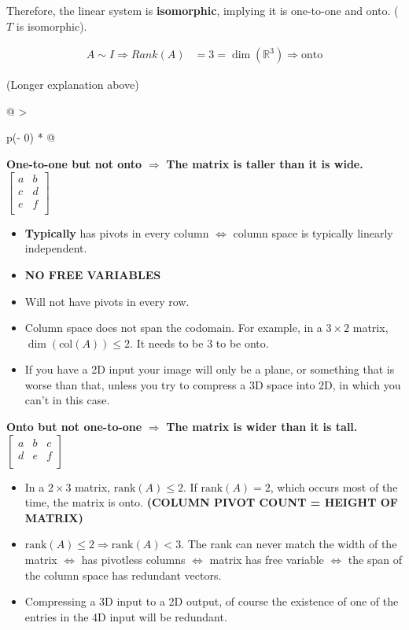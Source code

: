 \documentclass[
]{article}
\newcounter{example}
\begin{document}
Therefore, the linear system is \textbf{isomorphic}, implying it is
one-to-one and onto. ($T$ is isomorphic).

\begin{align*}
A\sim I \Rightarrow Rank(A) &= 3 = \dim\left( \mathbb{R}^{3} \right) \Rightarrow \text{onto}
\end{align*}


(Longer explanation above)

\begin{longtable}[]{@{}
  >{\raggedright\arraybackslash}p{(\columnwidth - 0\tabcolsep) * }@{}}
\toprule
\begin{minipage}[b]{\linewidth}\raggedright
\textbf{One-to-one but not onto} $\mathbf{\Rightarrow}$ \textbf{The
matrix is taller than it is wide.} $\begin{bmatrix}
a & b \\
c & d \\
e & f \\
\end{bmatrix}$

\begin{itemize}
\item
  \textbf{Typically} has pivots in every column $\Leftrightarrow$
  column space is typically linearly independent.
\item
  \textbf{NO FREE VARIABLES}
\item
  Will not have pivots in every row.
\item
  Column space does not span the codomain. For example, in a
  $3 \times 2$ matrix, $\dim\left( \text{col}(A) \right) \leq 2$. It
  needs to be 3 to be onto.
\item
  If you have a 2D input your image will only be a plane, or something
  that is worse than that, unless you try to compress a 3D space into
  2D, in which you can't in this case.
\end{itemize}

\textbf{Onto but not one-to-one} $\mathbf{\Rightarrow}$ \textbf{The
matrix is wider than it is tall.} $\begin{bmatrix}
a & b & c \\
d & e & f \\
\end{bmatrix}$

\begin{itemize}
\item
  In a $2 \times 3$ matrix, $\text{rank}(A) \leq 2$. If
  $\text{rank}(A) = 2$, which occurs most of the time, the matrix is
  onto. \textbf{(COLUMN PIVOT COUNT = HEIGHT OF MATRIX)}
\item
  $\text{rank}(A) \leq 2 \Rightarrow \text{rank}(A) < 3$. The rank can
  never match the width of the matrix $\Leftrightarrow$ has pivotless
  columns $\Leftrightarrow$ matrix has free variable
  $\Leftrightarrow$ the span of the column space has redundant
  vectors.
\item
  Compressing a 3D input to a 2D output, of course the existence of one
  of the entries in the 4D input will be redundant.
\end{itemize}


\end{minipage}
\end{longtable}
\end{document}

